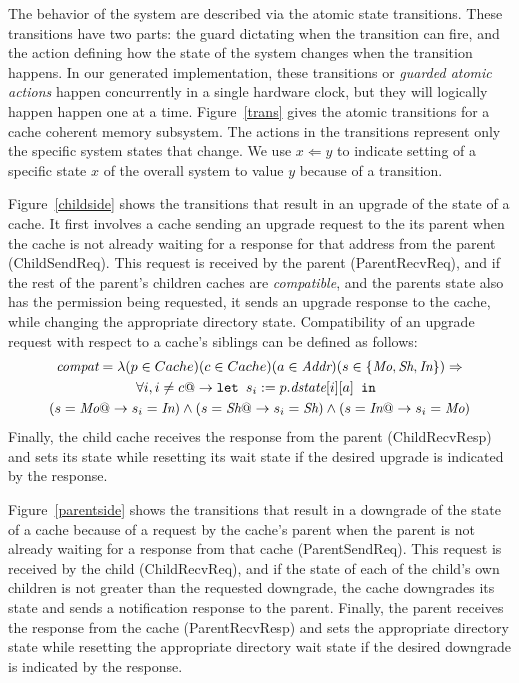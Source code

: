 The behavior of the system are described via the atomic state
transitions.  These transitions have two parts: the guard dictating
when the transition can fire, and the action defining how the state of
the system changes when the transition happens. In our generated
implementation, these transitions or \emph{guarded atomic actions}
happen concurrently in a single hardware clock, but they will
logically happen happen one at a time. Figure~\ref{trans} gives the
atomic transitions for a cache coherent memory subsystem. The actions
in the transitions represent only the specific system states that
change. We use $x \Leftarrow y$ to indicate setting of a specific
state $x$ of the overall system to value $y$ because of a transition.

Figure~\ref{childside} shows the transitions that result in an upgrade of the
state of a cache. It first involves a cache sending an upgrade request to the
its parent when the cache is not already waiting for a response for that
address from the parent (ChildSendReq). This request is received by the parent
(ParentRecvReq), and if the rest of the parent's children caches are
\emph{compatible}, and the parents state also has the permission being
requested, it sends an upgrade response to the cache, while changing the
appropriate directory state. Compatibility of an upgrade request with respect
to a cache's siblings can be defined as follows:
\begin{multline*}
\textit{compat} = \lambda (p \in Cache) (c \in Cache) (a \in \textit{Addr}) (s \in
\{\textit{Mo}, \textit{Sh}, \textit{In}\}) \Rightarrow\\ \forall i, i \ne c @->
\texttt{let } s_i := p.\textit{dstate}[i][a] \texttt{ in }\\
 (s = \textit{Mo} @-> s_i = \textit{In}) \wedge (s = \textit{Sh} @-> s_i = \textit{Sh}) \wedge (s = \textit{In} @-> s_i = \textit{Mo})
\end{multline*}
Finally, the child cache receives the response from the parent (ChildRecvResp)
and sets its state while resetting its wait state if the desired upgrade is
indicated by the response.

Figure~\ref{parentside} shows the transitions that result in a downgrade of the
state of a cache because of a request by the cache's parent when the parent is
not already waiting for a response from that cache (ParentSendReq).  This
request is received by the child (ChildRecvReq), and if the state of each of
the child's own children is not greater than the requested downgrade, the cache
downgrades its state and sends a notification response to the parent. Finally,
the parent receives the response from the cache (ParentRecvResp) and sets the
appropriate directory state while resetting the appropriate directory wait state
if the desired downgrade is indicated by the response.

